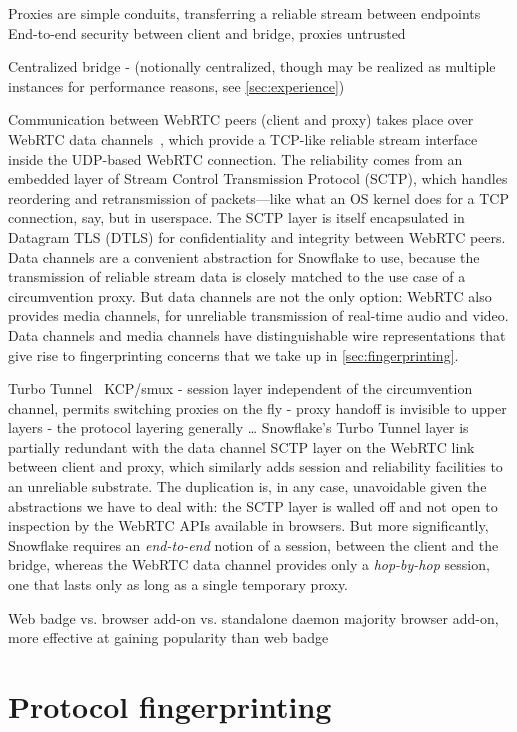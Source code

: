 \documentclass[letterpaper,twocolumn]{article}
\begin{document}

Proxies are simple conduits, transferring a reliable stream between endpoints
End-to-end security between client and bridge, proxies untrusted

Centralized bridge
- (notionally centralized, though may be realized as multiple instances for performance reasons, see \autoref{sec:experience})

Communication between WebRTC peers (client and proxy)
takes place over
WebRTC data channels~\cite{rfc8831}, which
provide a TCP-like
reliable stream interface inside the UDP-based WebRTC connection.
The reliability comes from an embedded layer of
Stream Control Transmission Protocol (SCTP), which
handles reordering and retransmission of packets---like
what an OS kernel does for a TCP connection, say,
but in userspace.
The SCTP layer is itself encapsulated in Datagram TLS (DTLS)
for confidentiality and integrity between WebRTC peers.
Data channels are a convenient abstraction for Snowflake to use,
because the transmission of reliable stream data is closely matched
to the use case of a circumvention proxy.
But data channels are not the only option:
WebRTC also provides media channels,
for unreliable transmission of real-time audio and video.
Data channels and media channels have distinguishable wire representations
that give rise to fingerprinting concerns that we take up in \autoref{sec:fingerprinting}.

Turbo Tunnel~\cite{Fifield2020a}
KCP/smux
- session layer independent of the circumvention channel, permits switching proxies on the fly
- proxy handoff is invisible to upper layers
- the protocol layering generally
\ldots
Snowflake's Turbo Tunnel layer
is partially redundant with the data channel SCTP layer
on the WebRTC link between client and proxy,
which similarly adds session and reliability facilities
to an unreliable substrate.
The duplication is, in any case, unavoidable
given the abstractions we have to deal with:
the SCTP layer is walled off and not open to inspection
by the WebRTC APIs available in browsers.
But more significantly, Snowflake requires an
\emph{end-to-end} notion of a session,
between the client and the bridge,
whereas the WebRTC data channel provides only a
\emph{hop-by-hop} session,
one that lasts only as long as a single temporary proxy.

Web badge vs. browser add-on vs. standalone daemon
majority browser add-on, more effective at gaining popularity than web badge

\section{Protocol fingerprinting}
\label{sec:fingerprinting}
\end{document}
